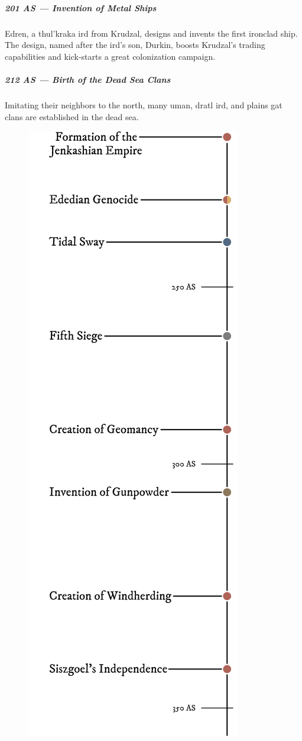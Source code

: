 \begin{linenumbers}
\subparagraph{201 AS --- Invention of Metal Ships} Edren, a thul'kraka ird from Krudzal, designs and invents the first ironclad ship.
The design, named after the ird's son, Durkin, boosts Krudzal's trading capabilities and kick-starts a great colonization campaign.

\subparagraph{212 AS --- Birth of the Dead Sea Clans} Imitating their neighbors to the north, many uman, dratl ird, and plains gat clans are established in the dead sea.


\begin{figure}[H]
    \centering \includegraphics{01intro/img/30history_iv.png}
\end{figure}


\end{linenumbers}
